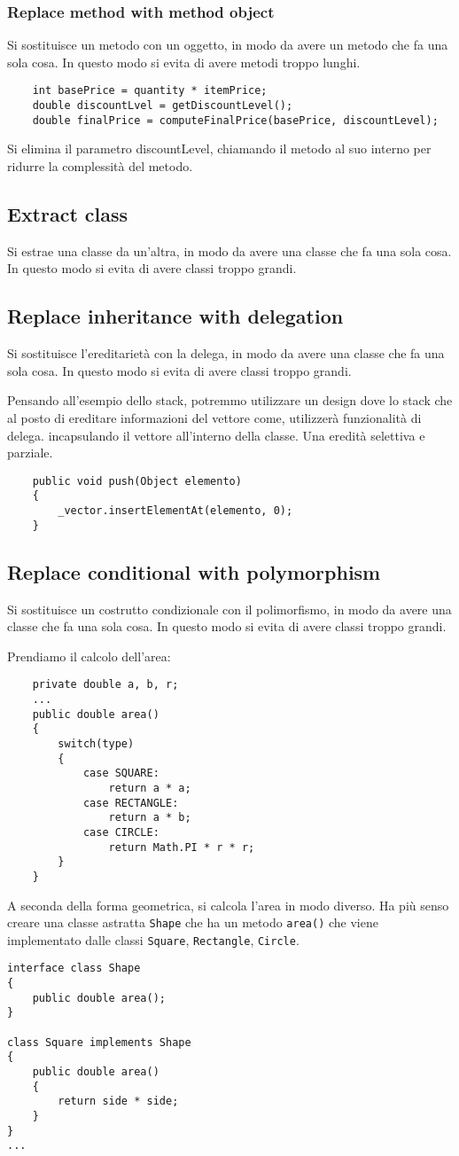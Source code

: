 \subsubsection{Replace method with method object}
Si sostituisce un metodo con un oggetto, in modo da avere un metodo
che fa una sola cosa. In questo modo si evita di avere metodi troppo lunghi.
\begin{lstlisting}
    int basePrice = quantity * itemPrice;
    double discountLvel = getDiscountLevel();
    double finalPrice = computeFinalPrice(basePrice, discountLevel);
\end{lstlisting}
Si elimina il parametro discountLevel, chiamando il metodo al suo interno 
per ridurre la complessità del metodo.
\subsection{Extract class}
Si estrae una classe da un'altra, in modo da avere una classe che
fa una sola cosa. In questo modo si evita di avere classi troppo grandi.
\subsection{Replace inheritance with delegation}
Si sostituisce l'ereditarietà con la delega, in modo da avere una classe che
fa una sola cosa. In questo modo si evita di avere classi troppo grandi.

Pensando all'esempio dello stack, potremmo utilizzare un design dove lo stack 
che al posto di ereditare informazioni del vettore come, utilizzerà funzionalità 
di delega. incapsulando il vettore all'interno della classe. Una eredità 
selettiva e parziale.
\begin{lstlisting}
    public void push(Object elemento)
    {
        _vector.insertElementAt(elemento, 0);
    }
\end{lstlisting}
\subsection{Replace conditional with polymorphism}
Si sostituisce un costrutto condizionale con il polimorfismo, in modo da
avere una classe che fa una sola cosa. In questo modo si evita di avere
classi troppo grandi.

Prendiamo il calcolo dell'area:
\begin{lstlisting}
    private double a, b, r;
    ...
    public double area()
    {
        switch(type)
        {
            case SQUARE:
                return a * a;
            case RECTANGLE:
                return a * b;
            case CIRCLE:
                return Math.PI * r * r;
        }
    }
\end{lstlisting}
A seconda della forma geometrica, si calcola l'area
in modo diverso.
Ha più senso creare una classe astratta \texttt{Shape} che
ha un metodo \texttt{area()} che viene implementato dalle classi
\texttt{Square}, \texttt{Rectangle}, \texttt{Circle}.
\begin{lstlisting}
interface class Shape
{
    public double area();
}

class Square implements Shape
{
    public double area()
    {
        return side * side;
    }
}
...
\end{lstlisting}
